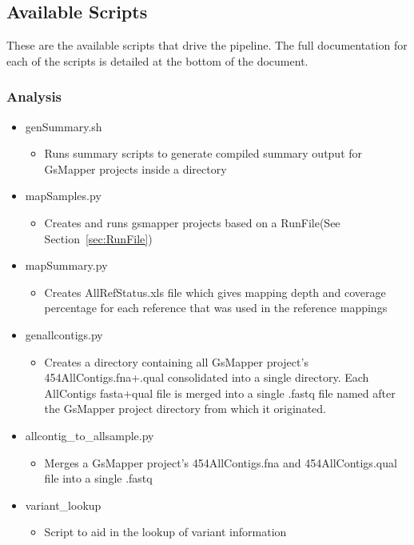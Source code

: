 \documentclass{article}
\begin{document}
\subsection{Available Scripts}
These are the available scripts that drive the pipeline.
The full documentation for each of the scripts is detailed at the bottom of the document.
\subsubsection{Analysis}
 \begin{itemize}
 \item genSummary.sh
  \begin{itemize}
   \item Runs summary scripts to generate compiled summary output for GsMapper projects inside a directory
  \end{itemize}
 \item mapSamples.py
  \begin{itemize}
   \item Creates and runs gsmapper projects based on a RunFile(See Section~\ref{sec:RunFile})
  \end{itemize}
 \item mapSummary.py
  \begin{itemize}
   \item Creates AllRefStatus.xls file which gives mapping depth and coverage percentage for each reference that was used in the reference mappings
  \end{itemize}
 \item genallcontigs.py
  \begin{itemize}
   \item Creates a directory containing all GsMapper project's 454AllContigs.fna+.qual consolidated into a single directory. Each AllContigs fasta+qual file is merged into a single .fastq file named after the GsMapper project directory from which it originated.
   \end{itemize}
 \item allcontig\_to\_allsample.py
  \begin{itemize}
   \item Merges a GsMapper project's 454AllContigs.fna and 454AllContigs.qual file into a single .fastq
  \end{itemize}
 \item variant\_lookup
  \begin{itemize}
   \item Script to aid in the lookup of variant information
  \end{itemize}
 \end{itemize}
\end{document}
